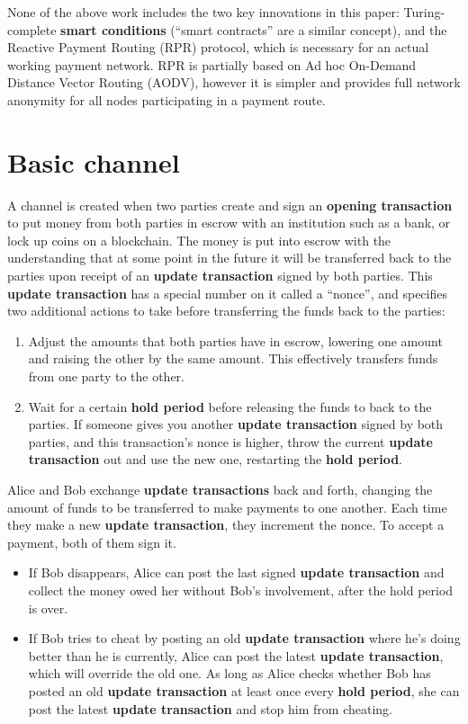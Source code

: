 \documentclass[a4paper]{article}
\newcommand{\bgls}[1]{\textbf{\gls{#1}}}
\newcommand{\bglspl}[1]{\textbf{\glspl{#1}}}
\begin{document}
None of the above work includes the two key innovations in this paper: Turing-complete \bglspl{smart condition} (``smart contracts'' are a similar concept), and the Reactive Payment Routing (RPR) protocol, which is necessary for an actual working payment network. RPR is partially based on Ad hoc On-Demand Distance Vector Routing (AODV)\cite{aodv}, however it is simpler and provides full network anonymity for all nodes participating in a payment route.

\section{Basic channel}

A channel is created when two parties create and sign an \bgls{opening transaction} to put money from both parties in escrow with an institution such as a bank, or lock up coins on a blockchain. The money is put into escrow with the understanding that at some point in the future it will be transferred back to the parties upon receipt of an \bgls{update transaction} signed by both parties. This \bgls{update transaction} has a special number on it called a ``nonce'', and specifies two additional actions to take before transferring the funds back to the parties:

\begin{enumerate}
\item Adjust the amounts that both parties have in escrow, lowering one amount and raising the other by the same amount. This effectively transfers funds from one party to the other.
\item Wait for a certain \bgls{hold period} before releasing the funds to back to the parties. If someone gives you another \bgls{update transaction} signed by both parties, and this transaction's nonce is higher, throw the current \bgls{update transaction} out and use the new one, restarting the \bgls{hold period}.
\end{enumerate}

Alice and Bob exchange \bglspl{update transaction} back and forth, changing the amount of funds to be transferred to make payments to one another. Each time they make a new \bgls{update transaction}, they increment the nonce. To accept a payment, both of them sign it.

\begin{itemize}
\item If Bob disappears, Alice can post the last signed \bgls{update transaction} and collect the money owed her without Bob's involvement, after the hold period is over.

\item If Bob tries to cheat by posting an old \bgls{update transaction} where he's doing better than he is currently, Alice can post the latest \bgls{update transaction}, which will override the old one. As long as Alice checks whether Bob has posted an old \bgls{update transaction} at least once every \bgls{hold period}, she can post the latest \bgls{update transaction} and stop him from cheating.
\end{itemize}
\end{document}
